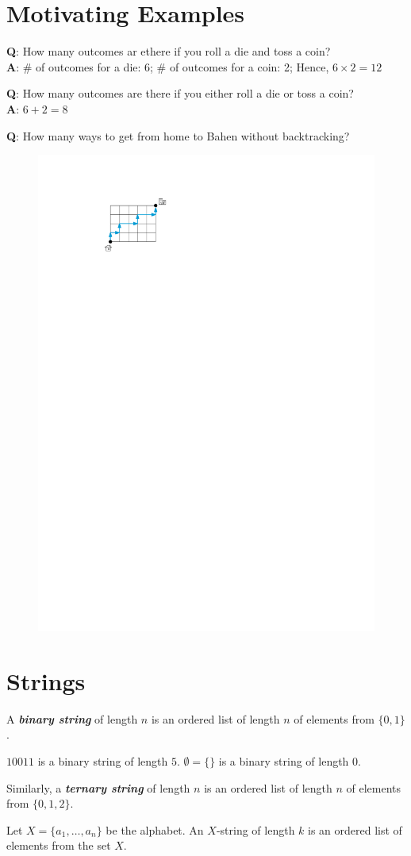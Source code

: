 \section{Motivating Examples}

\textbf{Q}: How many outcomes ar ethere if you roll a die and toss a coin? \\
\textbf{A}: \# of outcomes for a die: 6; \# of outcomes for a coin: 2; Hence, $6 \times 2 = 12$

\textbf{Q}: How many outcomes are there if you either roll a die or toss a coin? \\
\textbf{A}: $6 + 2 = 8$ 

\textbf{Q}: How many ways to get from home to Bahen without backtracking?
\begin{figure}[htbp]
   \centering
   \includegraphics[width=0.3\linewidth]{figures/house-to-bahen-path.pdf}
   \label{fig:home-to-bahen}
\end{figure}

\section{Strings}

\begin{definition}
   A \textit{\textbf{binary string}} of length $n$ is an ordered list of length $n$ of elements from $\{0,1\}$. 
\end{definition}

\begin{example}
   $10011$ is a binary string of length $5$. $\emptyset = \{\}$ is a binary string of length $0$.
\end{example}

Similarly, a \textit{\textbf{ternary string}} of length $n$ is an ordered list of length $n$ of elements from $\{0,1,2\}$.

\begin{definition}[X-String]
   Let $X = \{a_1,\ldots,a_n\}$ be the alphabet. An $X$-string of length $k$ is an ordered list of elements from the set $X$.
\end{definition}

